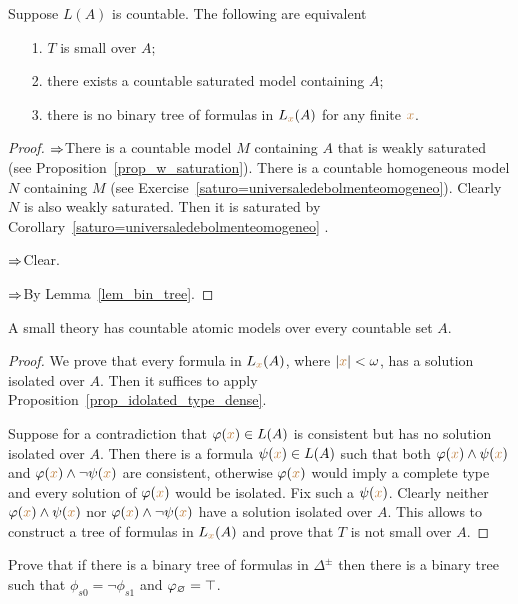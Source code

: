 \documentclass[creche.tex]{subfiles}
\begin{document}
\begin{proposition}\label{prop_small_equivalents}
Suppose $L(A)$ is countable. The following are equivalent\nobreak
\begin{itemize}   
\item[1.] $T$ is small over $A$;
\item[2.] there exists a countable saturated model containing $A$;
\item[3.] there is no binary tree of formulas in $L_{\color{brown} x}(A)$ for any finite ${\color{brown} x}$.
\end{itemize}
\end{proposition}
\begin{proof}$\Rightarrow$\quad There is a countable model $M$ containing $A$ that is weakly saturated (see Proposition~\ref{prop_w_saturation}). There is a countable homogeneous model $N$ containing $M$ (see Exercise~\ref{saturo=universaledebolmenteomogeneo}). Clearly $N$ is also weakly saturated. Then it is saturated by Corollary~\ref{saturo=universaledebolmenteomogeneo} .


$\Rightarrow$\quad Clear.

$\Rightarrow$\quad By Lemma~\ref{lem_bin_tree}.
\end{proof}


\begin{proposition} 
A small theory has countable atomic models over every countable set $A$.
\end{proposition}
\begin{proof}
We prove that every formula in $L_{\color{brown} x}(A)$, where $|{\color{brown} x}|<\omega$, has a solution isolated over $A$. Then it suffices to apply Proposition~\ref{prop_idolated_type_dense}. 

Suppose for a contradiction that $\varphi({\color{brown} x})\in L(A)$ is consistent but has no solution isolated over $A$. Then there is a formula $\psi({\color{brown} x})\in L(A)$ such that both $\varphi({\color{brown} x})\wedge\psi({\color{brown} x})$ and $\varphi({\color{brown} x})\wedge\neg\psi({\color{brown} x})$ are consistent, otherwise $\varphi({\color{brown} x})$ would imply a complete type and every solution of $\varphi({\color{brown} x})$ would be isolated. Fix such a $\psi({\color{brown} x})$. Clearly neither $\varphi({\color{brown} x})\wedge\psi({\color{brown} x})$ nor $\varphi({\color{brown} x})\wedge\neg\psi({\color{brown} x})$ have a solution isolated over $A$. This allows to construct a tree of formulas in $L_{\color{brown} x}(A)$ and prove that $T$ is not small over $A$.
\end{proof}

\begin{exercise}\label{ex_binary_tree_canonical}
Prove that if there is a binary tree of formulas in $\Delta^{\pm}$ then there is a binary tree such that $\phi_{s0}=\neg\phi_{s1}$ and $\varphi_{\varnothing}=\top$.\QED
\end{exercise}
\end{document}
